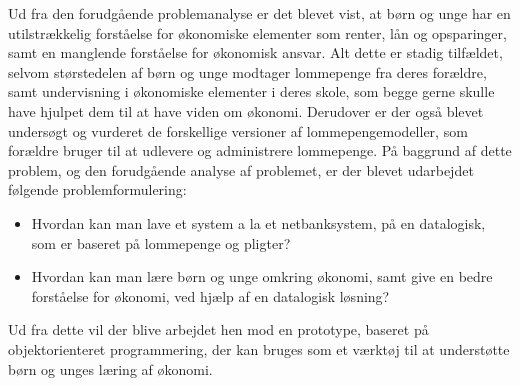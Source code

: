 Ud fra den forudgående problemanalyse er det blevet vist, at børn og unge har en utilstrækkelig forståelse for økonomiske elementer som renter, lån og opsparinger, samt en manglende forståelse for økonomisk ansvar. Alt dette er stadig tilfældet, selvom størstedelen af børn og unge modtager lommepenge fra deres forældre, samt undervisning i økonomiske elementer i deres skole, som begge gerne skulle have hjulpet dem til at have viden om økonomi. Derudover er der også blevet undersøgt og vurderet de forskellige versioner af lommepengemodeller, som forældre bruger til at udlevere og administrere lommepenge. På baggrund af dette problem, og den forudgående analyse af problemet, er der blevet udarbejdet følgende problemformulering:

\begin{itemize}

	\item Hvordan kan man lave et system a la et netbanksystem, på en datalogisk, som er baseret på lommepenge og pligter?
	\item Hvordan kan man lære børn og unge omkring økonomi, samt give en bedre forståelse for økonomi, ved hjælp af en datalogisk løsning?

\end{itemize}

Ud fra dette vil der blive arbejdet hen mod en prototype, baseret på objektorienteret programmering, der kan bruges som et værktøj til at understøtte børn og unges læring af økonomi.